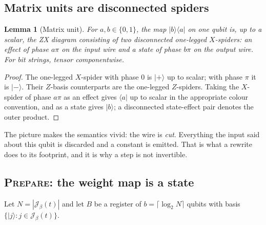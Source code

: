 \documentclass[11pt]{article}
\theoremstyle{definition}
\theoremstyle{plain}
\newtheorem{lemma}[definition]{Lemma}
\newcommand{\Jumps}{\mathcal{J}}
\newcommand{\PREP}{\textsc{Prepare}}
\newcommand{\bra}[1]{\langle #1 |}
\newcommand{\ket}[1]{| #1 \rangle}
\newcommand{\ketbra}[2]{| #1 \rangle\langle #2 |}
\begin{document}
\subsection{Matrix units are disconnected spiders}

\begin{lemma}[Matrix unit]\label{lem:matrixunit}
For $a,b \in \{0,1\}$, the map $\ketbra{b}{a}$ on one qubit is, up to a scalar, the ZX diagram
consisting of two disconnected one-legged $X$-spiders: an effect of phase $a\pi$ on the input
wire and a state of phase $b\pi$ on the output wire. For bit strings, tensor componentwise.
\end{lemma}

\begin{proof}
The one-legged $X$-spider with phase $0$ is $\ket{+}$ up to scalar; with phase $\pi$ it is
$\ket{-}$. Their $Z$-basis counterparts are the one-legged $Z$-spiders. Taking the $X$-spider
of phase $a\pi$ as an effect gives $\bra{a}$ up to scalar in the appropriate colour convention,
and as a state gives $\ket{b}$; a disconnected state-effect pair denotes the outer product.
\end{proof}

\begin{center}
\end{center}

The picture makes the semantics vivid: the wire is \emph{cut}. Everything the input said about
this qubit is discarded and a constant is emitted. That is what a rewrite does to its footprint,
and it is why a step is not invertible.

\subsection{\PREP: the weight map is a state}\label{ssec:prepare}

Let $N = |\Jumps_\beta(t)|$ and let $B$ be a register of $b = \lceil \log_2 N\rceil$ qubits with
basis $\{\ket{j} : j \in \Jumps_\beta(t)\}$.
\end{document}
